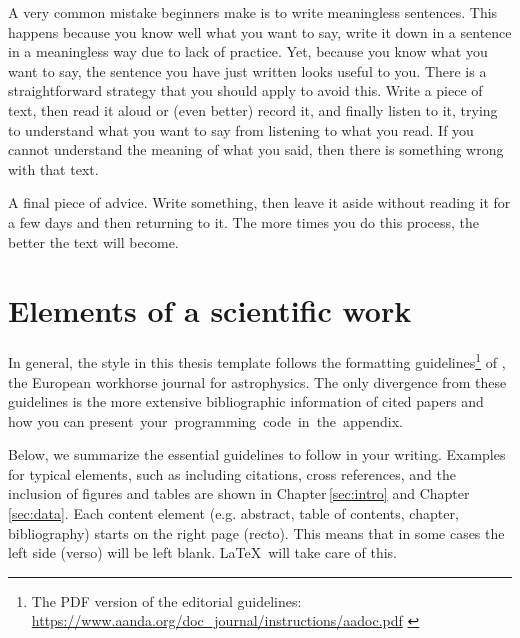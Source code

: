 A very common mistake beginners make is to write meaningless sentences. This happens because you know well what you want to say, write it down in a sentence in a meaningless way due to lack of practice.  Yet, because you know what you want to say, the sentence you have just written looks useful to you. There is a straightforward strategy that you should apply to avoid this. Write a piece of text, then read it aloud or (even better) record it, and finally listen to it, trying to understand what you want to say from listening to what you read. If you cannot understand the meaning of what you said, then there is something wrong with that text.

A final piece of advice. Write something, then leave it aside without reading it for a few days and then returning to it. The more times you do this process, the better the text will become.



\section*{Elements of a scientific work}
\noindent
In general, the style in this thesis template follows the formatting guidelines\footnote{The PDF version of the editorial guidelines: \href{https://www.aanda.org/doc_journal/instructions/aadoc.pdf}{https://www.aanda.org/doc\_journal/instructions/aadoc.pdf} \label{fn:AAstyleGuide}} of , the European  workhorse journal for astrophysics. The only divergence from these guidelines is the more extensive bibliographic information of cited papers and how you can \hbox{present your programming code in the appendix.}

Below, we summarize the essential guidelines to follow in your writing. 
Examples for typical elements, such as including citations, cross references, and the inclusion of figures and tables are shown in Chapter\,\ref{sec:intro} and Chapter\,\ref{sec:data}. Each content element (e.g. abstract, table of contents, chapter, bibliography) starts on the right page (recto). This means that in some cases the left side (verso) will be left blank. \LaTeX\ will take care of this.





